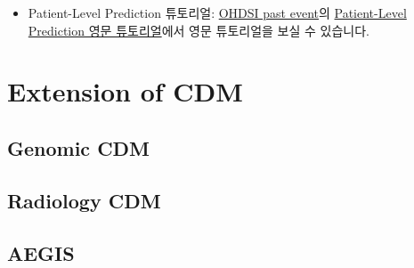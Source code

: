 \documentclass[]{book}
\providecommand{\tightlist}{%
  \setlength{\itemsep}{0pt}\setlength{\parskip}{0pt}}
\begin{document}
\begin{itemize}
\tightlist
\item
  Patient-Level Prediction 튜토리얼: \href{https://www.ohdsi.org/past-events/}{OHDSI past event}의 \href{https://www.ohdsi.org/past-events/patient-level-prediction}{Patient-Level Prediction 영문 튜토리얼}에서 영문 튜토리얼을 보실 수 있습니다.
\end{itemize}

\hypertarget{extension-of-cdm}{%
\chapter{Extension of CDM}\label{extension-of-cdm}}

\hypertarget{genomic-cdm}{%
\section{Genomic CDM}\label{genomic-cdm}}

\hypertarget{radiology-cdm}{%
\section{Radiology CDM}\label{radiology-cdm}}

\hypertarget{aegis}{%
\section{AEGIS}\label{aegis}}


\end{document}
